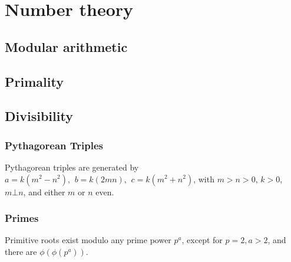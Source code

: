 \chapter{Number theory}

\section{Modular arithmetic}

\section{Primality}

\section{Divisibility}




\subsection{Pythagorean Triples}
 Pythagorean triples are generated by
  $a=k (m^{2}-n^{2}),\ \,b=k(2mn),\ \,c=k(m^{2}+n^{2})$,
 with $m > n > 0$, $k > 0$, $m \bot n$, and either $m$ or $n$ even.

\subsection{Primes}
	Primitive roots exist modulo any prime power $p^a$, except for $p = 2, a > 2$, and there are $\phi(\phi(p^a))$.

